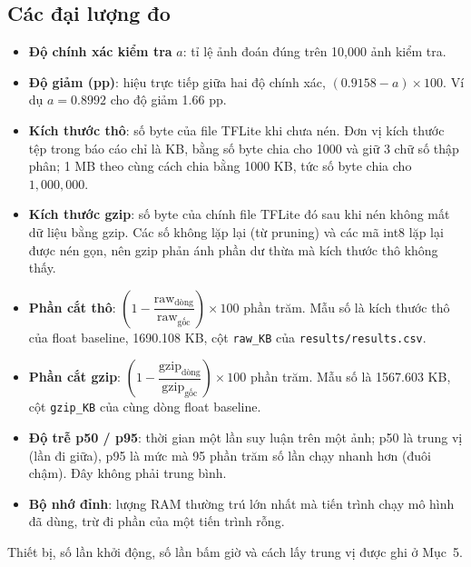 \documentclass[13pt,a4paper]{article}
\begin{document}
\subsection{Các đại lượng đo}
\label{sec:metrics}
\begin{itemize}[leftmargin=1.4em,itemsep=0.3em]
\item \textbf{Độ chính xác kiểm tra} \(a\): tỉ lệ ảnh đoán đúng trên 10{,}000 ảnh kiểm tra.
\item \textbf{Độ giảm (pp)}: hiệu trực tiếp giữa hai độ chính xác, \((0.9158 - a)\times 100\). Ví dụ \(a = 0.8992\) cho độ giảm 1.66 pp.
\item \textbf{Kích thước thô}: số byte của file TFLite khi chưa nén. Đơn vị kích thước tệp trong báo cáo chỉ là KB, bằng số byte chia cho 1000 và giữ 3 chữ số thập phân; 1 MB theo cùng cách chia bằng 1000 KB, tức số byte chia cho \(1{,}000{,}000\).
\item \textbf{Kích thước gzip}: số byte của chính file TFLite đó sau khi nén không mất dữ liệu bằng gzip. Các số không lặp lại (từ pruning) và các mã int8 lặp lại được nén gọn, nên gzip phản ánh phần dư thừa mà kích thước thô không thấy.
\item \textbf{Phần cắt thô}: \(\left(1 - \dfrac{\text{raw}_{\text{dòng}}}{\text{raw}_{\text{gốc}}}\right)\times 100\) phần trăm. Mẫu số là kích thước thô của float baseline, 1690.108 KB, cột \texttt{raw\_KB} của \texttt{results/results.csv}.
\item \textbf{Phần cắt gzip}: \(\left(1 - \dfrac{\text{gzip}_{\text{dòng}}}{\text{gzip}_{\text{gốc}}}\right)\times 100\) phần trăm. Mẫu số là 1567.603 KB, cột \texttt{gzip\_KB} của cùng dòng float baseline.
\item \textbf{Độ trễ p50 / p95}: thời gian một lần suy luận trên một ảnh; p50 là trung vị (lần đi giữa), p95 là mức mà 95 phần trăm số lần chạy nhanh hơn (đuôi chậm). Đây không phải trung bình.
\item \textbf{Bộ nhớ đỉnh}: lượng RAM thường trú lớn nhất mà tiến trình chạy mô hình đã dùng, trừ đi phần của một tiến trình rỗng.
\end{itemize}
Thiết bị, số lần khởi động, số lần bấm giờ và cách lấy trung vị được ghi ở Mục~5.

\end{document}
